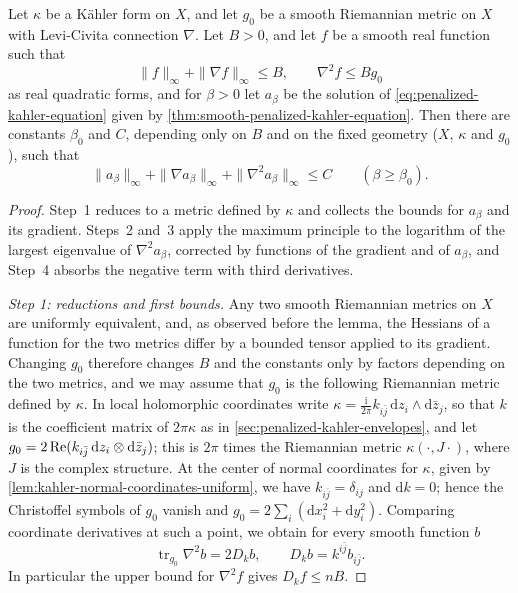 \begin{lemma}\label{lem:penalized-real-hessian}
Let $\kappa$ be a K\"ahler form on $X$, and let $g_0$ be a smooth Riemannian metric on $X$ with Levi-Civita connection $\nabla$. Let $B>0$, and let $f$ be a smooth real function such that
\[
 \|f\|_\infty+\|\nabla f\|_\infty\leq B,
 \qquad \nabla^2f\leq Bg_0
\]
as real quadratic forms, and for $\beta>0$ let $a_\beta$ be the solution of \eqref{eq:penalized-kahler-equation} given by \cref{thm:smooth-penalized-kahler-equation}. Then there are constants $\beta_0$ and $C$, depending only on $B$ and on the fixed geometry ($X$, $\kappa$ and $g_0$), such that
\[
 \|a_\beta\|_\infty+\|\nabla a_\beta\|_\infty
                      +\|\nabla^2a_\beta\|_\infty\leq C
 \qquad(\beta\geq\beta_0).
\]
\end{lemma}
\begin{proof}
Step~1 reduces to a metric defined by $\kappa$ and collects the bounds for $a_\beta$ and its gradient. Steps~2 and~3 apply the maximum principle to the logarithm of the largest eigenvalue of $\nabla^2a_\beta$, corrected by functions of the gradient and of $a_\beta$, and Step~4 absorbs the negative term with third derivatives.

\emph{Step 1: reductions and first bounds.} Any two smooth Riemannian metrics on $X$ are uniformly equivalent, and, as observed before the lemma, the Hessians of a function for the two metrics differ by a bounded tensor applied to its gradient. Changing $g_0$ therefore changes $B$ and the constants only by factors depending on the two metrics, and we may assume that $g_0$ is the following Riemannian metric defined by $\kappa$. In local holomorphic coordinates write $\kappa=\frac{\mathrm i}{2\pi}k_{i\bar j}\,\mathrm dz_i\wedge\mathrm d\bar z_j$, so that $k$ is the coefficient matrix of $2\pi\kappa$ as in \cref{sec:penalized-kahler-envelopes}, and let $g_0=2\operatorname{Re}(k_{i\bar j}\,\mathrm dz_i\otimes\mathrm d\bar z_j)$; this is $2\pi$ times the Riemannian metric $\kappa(\cdot,J\cdot)$, where $J$ is the complex structure. At the center of normal coordinates for $\kappa$, given by \cref{lem:kahler-normal-coordinates-uniform}, we have $k_{i\bar j}=\delta_{ij}$ and $\mathrm dk=0$; hence the Christoffel symbols of $g_0$ vanish and $g_0=2\sum_i(\mathrm dx_i^2+\mathrm dy_i^2)$. Comparing coordinate derivatives at such a point, we obtain for every smooth function $b$
\begin{equation}\label{eq:real-hessian-trace-identity}
 \operatorname{tr}_{g_0}\nabla^2b=2D_kb,
 \qquad D_kb=k^{i\bar j}b_{i\bar j}.
\end{equation}
In particular the upper bound for $\nabla^2f$ gives $D_kf\leq nB$.


\end{proof}
